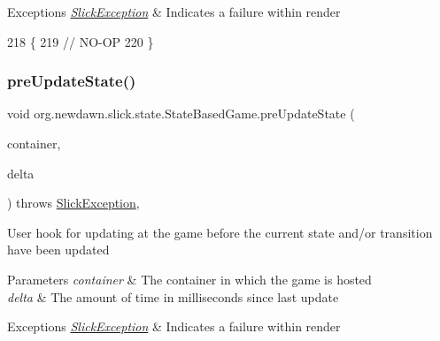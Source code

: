 \begin{DoxyExceptions}{Exceptions}
{\em \mbox{\hyperlink{classorg_1_1newdawn_1_1slick_1_1_slick_exception}{Slick\+Exception}}} & Indicates a failure within render \\
\hline
\end{DoxyExceptions}

\begin{DoxyCode}
218                                                                                              \{
219         \textcolor{comment}{// NO-OP}
220     \}
\end{DoxyCode}
\mbox{\label{classorg_1_1newdawn_1_1slick_1_1state_1_1_state_based_game_a3f40bf2b6e69b3c00b2aecd0b5bbcb19}} 
\subsubsection{\texorpdfstring{pre\+Update\+State()}{preUpdateState()}}
{\footnotesize\ttfamily void org.\+newdawn.\+slick.\+state.\+State\+Based\+Game.\+pre\+Update\+State (\begin{DoxyParamCaption}\item[{\mbox{\hyperlink{classorg_1_1newdawn_1_1slick_1_1_game_container}{Game\+Container}}}]{container,  }\item[{int}]{delta }\end{DoxyParamCaption}) throws \mbox{\hyperlink{classorg_1_1newdawn_1_1slick_1_1_slick_exception}{Slick\+Exception}}\hspace{0.3cm}{\ttfamily [inline]}, {\ttfamily [protected]}}

User hook for updating at the game before the current state and/or transition have been updated


\begin{DoxyParams}{Parameters}
{\em container} & The container in which the game is hosted \\
\hline
{\em delta} & The amount of time in milliseconds since last update \\
\hline
\end{DoxyParams}

\begin{DoxyExceptions}{Exceptions}
{\em \mbox{\hyperlink{classorg_1_1newdawn_1_1slick_1_1_slick_exception}{Slick\+Exception}}} & Indicates a failure within render \\
\hline
\end{DoxyExceptions}

